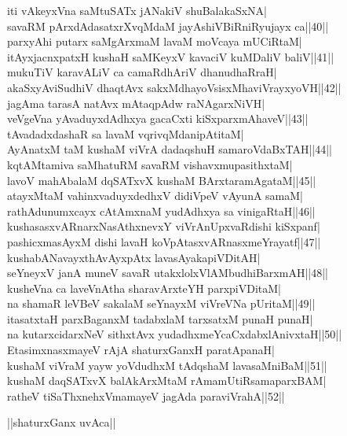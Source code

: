 \documentclass{article}
\begin{document}
iti vAkeyxVna saMtuSATx jANakiV shuBalakaSxNA|\\
savaRM pArxdAdasatxrXvqMdaM jayAshiVBiRniRyujayx ca||40||\\
parxyAhi putarx saMgArxmaM lavaM moVcaya mUCiRtaM|\\
itAyxjacnxpatxH kushaH saMKeyxV kavaciV kuMDaliV baliV||41||\\
mukuTiV karavALiV ca camaRdhAriV dhanudhaRraH|\\
akaSxyAviSudhiV dhaqtAvx sakxMdhayoVsisxMhaviVrayxyoVH||42||\\
jagAma tarasA natAvx mAtaqpAdw raNAgarxNiVH|\\
veVgeVna yAvaduyxdAdhxya gacaCxti kiSxparxmAhaveV||43||\\
tAvadadxdashaR sa lavaM vqrivqMdanipAtitaM|\\
AyAnatxM taM kushaM viVrA dadaqshuH samaroVdaBxTAH||44||\\
kqtAMtamiva saMhatuRM savaRM vishavxmupasithxtaM|\\
lavoV mahAbalaM dqSATxvX kushaM BArxtaramAgataM||45||\\
atayxMtaM vahinxvaduyxdedhxV didiVpeV vAyunA samaM|\\
rathAdunumxcayx cAtAmxnaM yudAdhxya sa vinigaRtaH||46||\\
kushasasxvARnarxNasAthxnevxY viVrAnUpxvaRdishi kiSxpanf|\\
pashicxmasAyxM dishi lavaH koVpAtasxvARnasxmeYrayatf||47||\\
kushabANavayxthAvAyxpAtx lavasAyakapiVDitAH|\\
seYneyxV janA muneV savaR utakxlolxVlAMbudhiBarxmAH||48||\\
kusheVna ca laveVnAtha sharavArxteYH parxpiVDitaM|\\
na shamaR leVBeV sakalaM seYnayxM viVreVNa pUritaM||49||\\
itasatxtaH parxBaganxM tadabxlaM tarxsatxM punaH punaH|\\
na kutarxcidarxNeV sithxtAvx yudadhxmeYcaCxdabxlAnivxtaH||50||\\
EtasimxnasxmayeV rAjA shaturxGanxH paratApanaH|\\
kushaM viVraM yayw yoVdudhxM tAdqshaM lavasaMniBaM||51||\\
kushaM daqSATxvX balAkArxMtaM rAmamUtiRsamaparxBAM|\\
ratheV tiSaThxnehxVmamayeV jagAda paraviVrahA||52||\\

\begin{center}
||shaturxGanx uvAca||
\end{center}
\end{document}
